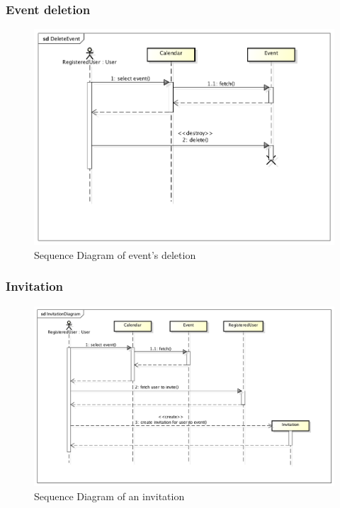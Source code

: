 \subsubsection{Event deletion}
\begin{center}
 \begin{figure}[H]
    \includegraphics[width=1\textwidth]{../UMLDiagram/sequence/DeleteEvent/DeleteEvent.png}
    \caption{Sequence Diagram of event's deletion}
     \label{fig:delseqdiag}
     \end{figure}
   \end{center}  
\subsubsection{Invitation}
\begin{center}
 \begin{figure}[H]
    \includegraphics[width=1\textwidth]{../UMLDiagram/sequence/InvitationDiagram/InvitationDiagram.png}
    \caption{Sequence Diagram of an invitation}
     \label{fig:invitseqdiag}
     \end{figure}
   \end{center}  
